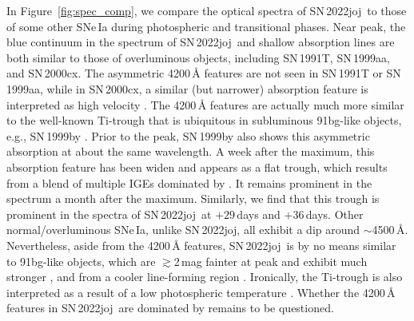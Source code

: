 \documentclass[twocolumn]{aastex631}
\newcommand{\sn}{SN\,2022joj}
\begin{document}
\begin{CJK*}{UTF8}{gbsn}
In Figure~\ref{fig:spec_comp}, we compare the optical spectra of \sn\ to those of some other SNe\,Ia during photospheric and transitional phases. Near peak, the blue continuum in the spectrum of \sn\ and shallow absorption lines are both similar to those of overluminous objects, including SN\,1991T, SN\,1999aa, and SN\,2000cx. The asymmetric 4200\,\r{A} features are not seen in SN\,1991T or SN\,1999aa, while in SN\,2000cx, a similar (but narrower) absorption feature is interpreted as high velocity  \citep{Branch_00cx_2004}. The 4200\,\r{A} features are actually much more similar to the well-known Ti-trough that is ubiquitous in subluminous 91bg-like objects, e.g., SN\,1999by \citep{Arbour_1999}. Prior to the peak, SN\,1999by also shows this asymmetric absorption at about the same wavelength. A week after the maximum, this absorption feature has been widen and appears as a flat trough, which results from a blend of multiple IGEs dominated by  \citep{Filippenko_91bg_1992,Mazzali_1997}. It remains prominent in the spectrum a month after the maximum. Similarly, we find that this trough is prominent in the spectra of \sn\ at $+29$\,days and $+36$\,days. Other normal/overluminous SNe\,Ia, unlike \sn, all exhibit a dip around $\sim$4500\,\r{A}. Nevertheless, aside from the 4200\,\r{A} features, \sn\ is by no means similar to 91bg-like objects, which are $\gtrsim$2\,mag fainter at peak and exhibit much stronger ,  and  from a cooler line-forming region \citep{Filippenko_91bg_1992}. Ironically, the Ti-trough is also interpreted as a result of a low photospheric temperature \citep{Mazzali_1997}. Whether the 4200\,\r{A} features in \sn\ are dominated by  remains to be questioned.


\end{CJK*}
\end{document}
